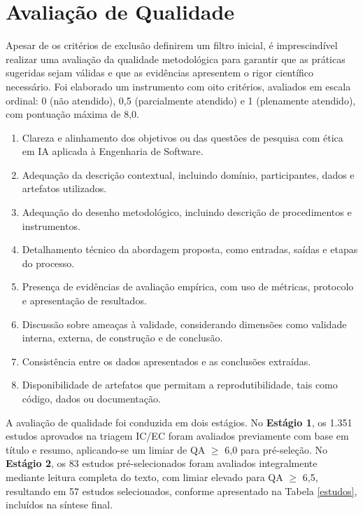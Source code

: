 \section{Avaliação de Qualidade}

Apesar de os critérios de exclusão definirem um filtro inicial, é imprescindível realizar uma avaliação da qualidade metodológica para garantir que as práticas sugeridas sejam válidas e que as evidências apresentem o rigor científico necessário. Foi elaborado um instrumento com oito critérios, avaliados em escala ordinal: 0 (não atendido), 0,5 (parcialmente atendido) e 1 (plenamente atendido), com pontuação máxima de 8,0.

\begin{enumerate}
    \item[(QA1)] Clareza e alinhamento dos objetivos ou das questões de pesquisa com ética em \acrshort{IA} aplicada à Engenharia de Software.
    
    \item[(QA2)] Adequação da descrição contextual, incluindo domínio, participantes, dados e artefatos utilizados.
    
    \item[(QA3)] Adequação do desenho metodológico, incluindo descrição de procedimentos e instrumentos.
    
    \item[(QA4)] Detalhamento técnico da abordagem proposta, como entradas, saídas e etapas do processo.
    
    \item[(QA5)] Presença de evidências de avaliação empírica, com uso de métricas, protocolo e apresentação de resultados.
    
    \item[(QA6)] Discussão sobre ameaças à validade, considerando dimensões como validade interna, externa, de construção e de conclusão.
    
    \item[(QA7)] Consistência entre os dados apresentados e as conclusões extraídas.
    
    \item[(QA8)] Disponibilidade de artefatos que permitam a reprodutibilidade, tais como código, dados ou documentação.
\end{enumerate}

A avaliação de qualidade foi conduzida em dois estágios. No \textbf{Estágio 1}, os 1.351 estudos aprovados na triagem IC/EC foram avaliados previamente com base em título e resumo, aplicando-se um limiar de QA $\geq$ 6,0 para pré-seleção. No \textbf{Estágio 2}, os 83 estudos pré-selecionados foram avaliados integralmente mediante leitura completa do texto, com limiar elevado para QA $\geq$ 6,5, resultando em 57 estudos selecionados, conforme apresentado na Tabela \ref{estudos}, incluídos na síntese final.


